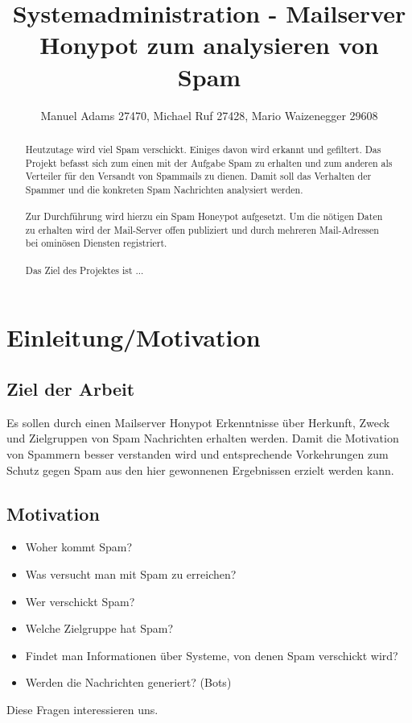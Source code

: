 \documentclass[a4paper,11pt,singlespacing]{article}
\begin{document}

\title{Systemadministration - Mailserver Honypot zum analysieren von Spam}
\author{Manuel Adams 27470, Michael Ruf 27428, Mario Waizenegger 29608}
\maketitle
\begin{abstract}
Heutzutage wird viel Spam verschickt. Einiges davon wird erkannt und gefiltert.
Das Projekt befasst sich zum einen mit der Aufgabe Spam zu erhalten und zum anderen als Verteiler für den Versandt von Spammails zu dienen. Damit soll das Verhalten der Spammer und die konkreten Spam Nachrichten analysiert werden.
\\\\
Zur Durchführung wird hierzu ein Spam Honeypot aufgesetzt.
Um die nötigen Daten zu erhalten wird der Mail-Server offen publiziert und durch mehreren Mail-Adressen bei ominösen Diensten registriert.
\\\\
Das Ziel des Projektes ist ...\color{red}{TODO}
\end{abstract}

\newpage

\tableofcontents

\newpage
{}

\section{Einleitung/Motivation}\label{sec:Einleitung}

	\subsection{Ziel der Arbeit}\label{sec:Ziel}
		Es sollen durch einen Mailserver Honypot Erkenntnisse über Herkunft, Zweck und Zielgruppen von Spam Nachrichten erhalten werden. Damit die Motivation von Spammern besser verstanden wird und entsprechende Vorkehrungen zum Schutz gegen Spam aus den hier gewonnenen Ergebnissen erzielt werden kann.

	\subsection{Motivation}\label{sec:Motivation}
		\begin{itemize}
		\item Woher kommt Spam?
		\item Was versucht man mit Spam zu erreichen?
		\item Wer verschickt Spam?
		\item Welche Zielgruppe hat Spam?
		\item Findet man Informationen über Systeme, von denen Spam verschickt wird?
		\item Werden die Nachrichten generiert? (Bots)
		\end{itemize}
		Diese Fragen interessieren uns.
	
\end{document}
